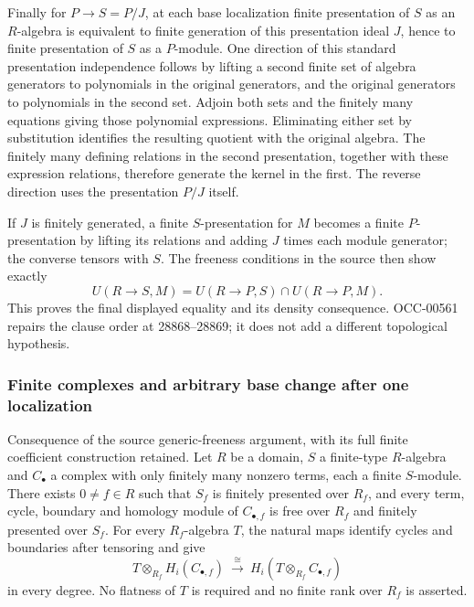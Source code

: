Finally for \(P\to S=P/J\), at each base localization finite presentation of \(S\) as an \(R\)-algebra is equivalent to finite generation of this presentation ideal \(J\), hence to finite presentation of \(S\) as a \(P\)-module. One direction of this standard presentation independence follows by lifting a second finite set of algebra generators to polynomials in the original generators, and the original generators to polynomials in the second set. Adjoin both sets and the finitely many equations giving those polynomial expressions. Eliminating either set by substitution identifies the resulting quotient with the original algebra. The finitely many defining relations in the second presentation, together with these expression relations, therefore generate the kernel in the first. The reverse direction uses the presentation \(P/J\) itself.

If \(J\) is finitely generated, a finite \(S\)-presentation for \(M\) becomes a finite \(P\)-presentation by lifting its relations and adding \(J\) times each module generator; the converse tensors with \(S\). The freeness conditions in the source then show exactly \[
 U(R\to S,M)=U(R\to P,S)\cap U(R\to P,M).
\] This proves the final displayed equality and its density consequence. OCC-00561 repairs the clause order at 28868--28869; it does not add a different topological hypothesis.

\subsubsection{Finite complexes and arbitrary base change after one localization}\label{finite-complexes-and-arbitrary-base-change-after-one-localization}

Consequence of the source generic-freeness argument, with its full finite coefficient construction retained. Let \(R\) be a domain, \(S\) a finite-type \(R\)-algebra and \(C_\bullet\) a complex with only finitely many nonzero terms, each a finite \(S\)-module. There exists \(0\ne f\in R\) such that \(S_f\) is finitely presented over \(R_f\), and every term, cycle, boundary and homology module of \(C_{\bullet,f}\) is free over \(R_f\) and finitely presented over \(S_f\). For every \(R_f\)-algebra \(T\), the natural maps identify cycles and boundaries after tensoring and give \[
 T\otimes_{R_f}H_i(C_{\bullet,f})
 \ \xrightarrow{\ \cong\ }\
 H_i(T\otimes_{R_f}C_{\bullet,f})
\] in every degree. No flatness of \(T\) is required and no finite rank over \(R_f\) is asserted.

